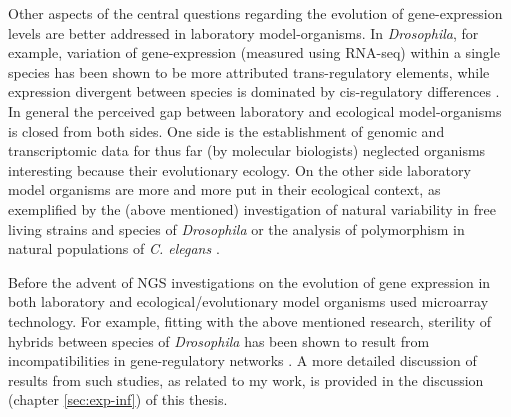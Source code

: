 Other aspects of the central questions regarding the evolution of
gene-expression levels are better addressed in laboratory
model-organisms. In \textit{Drosophila}, for example, variation of
gene-expression (measured using RNA-seq) within a single species has
been shown to be more attributed trans-regulatory elements, while
expression divergent between species is dominated by cis-regulatory
differences \cite{pmid20354124}. In general the perceived gap between
laboratory and ecological model-organisms is closed from both
sides. One side is the establishment of genomic and transcriptomic data
for thus far (by molecular biologists) neglected organisms interesting
because their evolutionary ecology. On the other side laboratory model
organisms are more and more put in their ecological context, as
exemplified by the (above mentioned) investigation of natural
variability in free living strains and species of \textit{Drosophila}
or the analysis of polymorphism in natural populations of
\textit{C. elegans} \cite{pmid20133352}.

Before the advent of NGS investigations on the evolution of gene
expression in both laboratory and ecological/evolutionary model
organisms used microarray technology. For example, fitting with the
above mentioned research, sterility of hybrids between species of
\textit{Drosophila} has been shown to result from incompatibilities in
gene-regulatory networks \cite{pmid16757655}. A more detailed
discussion of results from such studies, as related to my work, is
provided in the discussion (chapter \ref{sec:exp-inf}) of this thesis.





